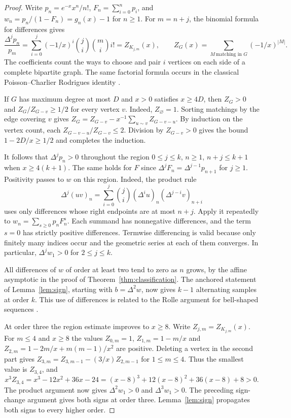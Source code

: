 \documentclass[11pt,a4paper]{article}
\begin{document}
\begin{proof}
Write $p_n=e^{-x}x^n/n!$, $F_n=\sum_{i=0}^n p_i$, and
$w_n=p_n/(1-F_n)=g_n(x)-1$ for $n\ge1$. For $m=n+j$, the binomial
formula for differences gives
\[
 \frac{\Delta^j p_n}{p_m}
 =\sum_{i=0}^{j}(-1/x)^i\binom ji\binom mi i!
 = Z_{K_{j,m}}(x),\qquad
 Z_G(x)=\sum_{M\,\text{matching in }G}(-1/x)^{|M|}.
\]
The coefficients count the ways to choose and pair $i$ vertices on each
side of a complete bipartite graph. The same factorial formula occurs
in the classical Poisson--Charlier Rodrigues identity \cite{goldstein}.

If $G$ has maximum degree at most $D$ and $x>0$ satisfies $x\ge4D$,
then $Z_G>0$ and $Z_G/Z_{G-v}\ge1/2$ for every vertex $v$.
Indeed, $Z_{\varnothing}=1$. Sorting matchings by the edge covering $v$
gives $Z_G=Z_{G-v}-x^{-1}\sum_{u\sim v}Z_{G-v-u}$. By induction on
the vertex count, each $Z_{G-v-u}/Z_{G-v}\le2$. Division by $Z_{G-v}>0$
gives the bound $1-2D/x\ge1/2$ and completes the induction.

It follows that $\Delta^j p_n>0$ throughout the region
$0\le j\le k$, $n\ge1$, $n+j\le k+1$ when $x\ge4(k+1)$.
The same holds for $F$ since $\Delta^j F_n=\Delta^{j-1}p_{n+1}$
for $j\ge1$. Positivity passes to $w$ on this region.
Indeed, the product rule
\[
 \Delta^j(uv)_n=\sum_{i=0}^j\binom ji
 (\Delta^i u)_n(\Delta^{j-i}v)_{n+i}
\]
uses only differences whose right endpoints are at most $n+j$.
Apply it repeatedly to $w_n=\sum_{s\ge0}p_nF_n^s$. Each summand has
nonnegative differences, and the term $s=0$ has strictly positive
differences. Termwise differencing is valid because only finitely many
indices occur and the geometric series at each of them converges.
In particular, $\Delta^j w_1>0$ for $2\le j\le k$.

All differences of $w$ of order at least two tend to zero as $n$ grows, by the affine asymptotic in the proof of Theorem~\ref{thm:classification}. The anchored statement of Lemma~\ref{lem:sign}, starting with $b=\Delta^2 w$, now gives $k-1$ alternating samples at order $k$. This use of differences is related to the Rolle argument for bell-shaped sequences \cite{kw}.

At order three the region estimate improves to $x\ge8$. Write
$Z_{j,m}=Z_{K_{j,m}}(x)$. For $m\le4$ and $x\ge8$ the values
$Z_{0,m}=1$, $Z_{1,m}=1-m/x$ and
$Z_{2,m}=1-2m/x+m(m-1)/x^2$ are positive.
Deleting a vertex in the second part gives
$Z_{3,m}=Z_{3,m-1}-(3/x)Z_{2,m-1}$ for $1\le m\le4$.
Thus the smallest value is $Z_{3,4}$, and
\[
 x^3 Z_{3,4}=x^3-12x^2+36x-24
 =(x-8)^3+12(x-8)^2+36(x-8)+8>0.
\]
The product argument now gives $\Delta^2 w_1>0$ and $\Delta^3 w_1>0$.
The preceding sign-change argument gives both signs at order three.
Lemma~\ref{lem:sign} propagates both signs to every higher order.
\end{proof}
\end{document}
